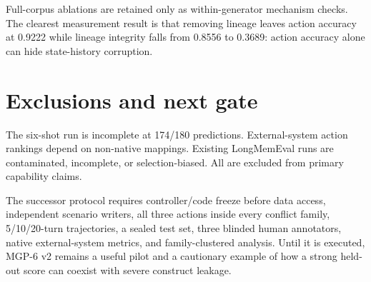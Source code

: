 Full-corpus ablations are retained only as within-generator mechanism
checks. The clearest measurement result is that removing lineage leaves
action accuracy at 0.9222 while lineage integrity falls from 0.8556 to
0.3689: action accuracy alone can hide state-history corruption.

\section{Exclusions and next gate}\label{exclusions-and-next-gate}

The six-shot run is incomplete at 174/180 predictions. External-system
action rankings depend on non-native mappings. Existing LongMemEval runs
are contaminated, incomplete, or selection-biased. All are excluded from
primary capability claims.

The successor protocol requires controller/code freeze before data
access, independent scenario writers, all three actions inside every
conflict family, 5/10/20-turn trajectories, a sealed test set, three
blinded human annotators, native external-system metrics, and
family-clustered analysis. Until it is executed, MGP-6 v2 remains a
useful pilot and a cautionary example of how a strong held-out score can
coexist with severe construct leakage.

